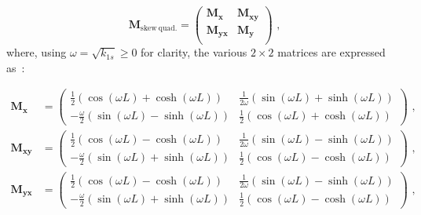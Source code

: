 \begin{equation}
    \mathbf{M}_\mathrm{skew\ quad.} = \begin{pmatrix}
        \mathbf{M_x}    & \mathbf{M_{xy}}  \\
        \mathbf{M_{yx}} & \mathbf{M_y}   \\
    \end{pmatrix} \text{ ,}
    \label{equation:skew_quad_transfer_matrix}
\end{equation}
where, using \(\omega = \sqrt{k_{1s}} \ge 0\) for clarity, the various \(2 \times 2\) matrices are expressed as~\cite{Lecture:Wolski:Dynamical_Maps_Linear_Elements}:

\begin{equation}
    \begin{aligned}
        \mathbf{M_x} &= \begin{pmatrix}
            \frac{1}{2} \left( \cos \left(\omega L\right) + \cosh \left(\omega L\right)\right)        &  \frac{1}{2 \omega} \left( \sin \left(\omega L\right) + \sinh \left(\omega L\right)\right) \\
            -\frac{\omega}{2} \left( \sin \left(\omega L\right) - \sinh \left(\omega L\right)\right)  &  \frac{1}{2} \left( \cos \left(\omega L\right) + \cosh \left(\omega L\right) \right)
        \end{pmatrix} \text{ ,} \\
        \mathbf{M_{xy}} &= \begin{pmatrix}
            \frac{1}{2} \left( \cos \left(\omega L\right) - \cosh \left(\omega L\right)\right)        &  \frac{1}{2 \omega} \left( \sin \left(\omega L\right) - \sinh \left(\omega L\right)\right) \\
            -\frac{\omega}{2} \left( \sin \left(\omega L\right) + \sinh \left(\omega L\right)\right)  &  \frac{1}{2} \left( \cos \left(\omega L\right) - \cosh \left(\omega L\right)\right)
        \end{pmatrix} \text{ ,} \\
        \mathbf{M_{yx}} &= \begin{pmatrix}
            \frac{1}{2} \left( \cos \left(\omega L\right) - \cosh \left(\omega L\right)\right)              &  \frac{1}{2 \omega} \left( \sin \left(\omega L\right) - \sinh \left(\omega L\right)\right) \\
            -\frac{\omega}{2} \left( \sin \left(\omega L\right) + \sinh \left(\omega L\right)\right)  &  \frac{1}{2} \left( \cos \left(\omega L\right) - \cosh \left(\omega L\right)\right)
        \end{pmatrix} \text{ ,} \\

\end{aligned}
\end{equation}
